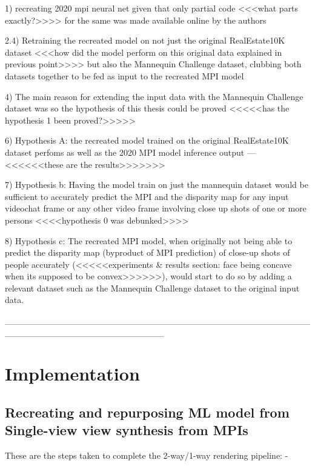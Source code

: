 1) recreating 2020 mpi neural net given that only partial code <<<what parts exactly?>>>> for the same was made available online by the authors 

    2.4) Retraining the recreated model on not just the original RealEstate10K dataset <<<how did the model perform on this original data explained in previous point>>>> but also the Mannequin Challenge dataset, clubbing both datasets together to be fed as input to the recreated MPI model

4) The main reason for extending the input data with the Mannequin Challenge dataset was so the hypothesis of this thesis could be proved <<<<<has the hypothesis 1 been proved?>>>>>

6) Hypothesis A: the recreated model trained on the original RealEstate10K dataset perfoms as well as the 2020 MPI model inference output --- <<<<<<these are the results>>>>>>> 

7) Hypothesis b: Having the model train on just the mannequin dataset would be sufficient to accurately predict the MPI and the disparity map for any input videochat frame or any other video frame involving close up shots of one or more persons <<<<hypothesis 0 was debunked>>>>

8) Hypothesis c: The recreated MPI model, when originally not being able to predict the disparity map (byproduct of MPI prediction) of close-up shots of people accurately (<<<<<experiments & results section: face being concave when its supposed to be convex>>>>>>), would start to do so by adding a relevant dataset such as the Mannequin Challenge dataset to the original input data.


_________________________________________________________________________

\chapter{Implementation}\label{ch:implementation}

\section{Recreating and repurposing ML model from Single-view view synthesis from MPIs}\label{sec:contributions}






These are the steps taken to complete the 2-way/1-way rendering pipeline: -

